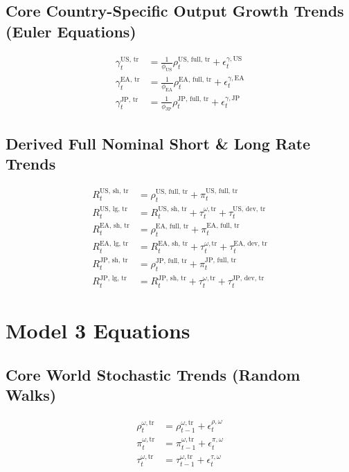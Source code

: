 \documentclass{article}
\begin{document}
\subsection*{Core Country-Specific Output Growth Trends (Euler Equations)}
\begin{align}
    \gamma^{\text{US, tr}}_t &= \frac{1}{\phi_{\text{US}}} \rho^{\text{US, full, tr}}_t + \epsilon^{\gamma, \text{US}}_t \\
    \gamma^{\text{EA, tr}}_t &= \frac{1}{\phi_{\text{EA}}} \rho^{\text{EA, full, tr}}_t + \epsilon^{\gamma, \text{EA}}_t \\
    \gamma^{\text{JP, tr}}_t &= \frac{1}{\phi_{\text{JP}}} \rho^{\text{JP, full, tr}}_t + \epsilon^{\gamma, \text{JP}}_t
\end{align}

\subsection*{Derived Full Nominal Short \& Long Rate Trends}
\begin{align}
    R^{\text{US, sh, tr}}_t &= \rho^{\text{US, full, tr}}_t + \pi^{\text{US, full, tr}}_t \\
    R^{\text{US, lg, tr}}_t  &= R^{\text{US, sh, tr}}_t + \tau^{\omega, \text{tr}}_t + \tau^{\text{US, dev, tr}}_t \\
    R^{\text{EA, sh, tr}}_t &= \rho^{\text{EA, full, tr}}_t + \pi^{\text{EA, full, tr}}_t \\
    R^{\text{EA, lg, tr}}_t  &= R^{\text{EA, sh, tr}}_t + \tau^{\omega, \text{tr}}_t + \tau^{\text{EA, dev, tr}}_t \\
    R^{\text{JP, sh, tr}}_t &= \rho^{\text{JP, full, tr}}_t + \pi^{\text{JP, full, tr}}_t \\
    R^{\text{JP, lg, tr}}_t  &= R^{\text{JP, sh, tr}}_t + \tau^{\omega, \text{tr}}_t + \tau^{\text{JP, dev, tr}}_t
\end{align}

\clearpage
\section*{Model 3 Equations} %

\subsection*{Core World Stochastic Trends (Random Walks)}
\begin{align}
    \rho^{\omega, \text{tr}}_t &= \rho^{\omega, \text{tr}}_{t-1} + \epsilon^{\rho, \omega}_t \\
    \pi^{\omega, \text{tr}}_t &= \pi^{\omega, \text{tr}}_{t-1} + \epsilon^{\pi, \omega}_t \\
    \tau^{\omega, \text{tr}}_t &= \tau^{\omega, \text{tr}}_{t-1} + \epsilon^{\tau, \omega}_t
\end{align}
\end{document}

